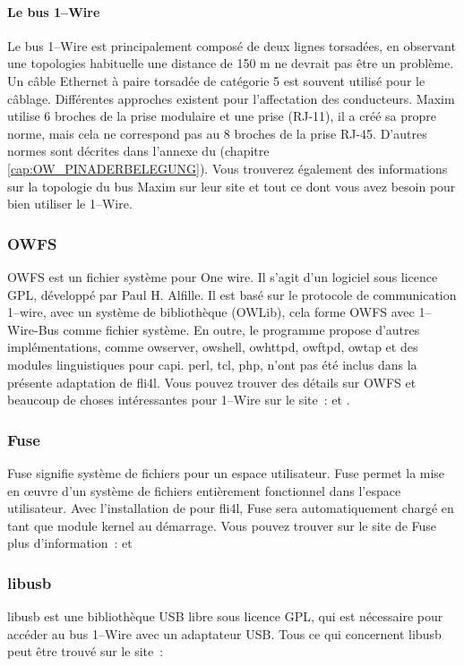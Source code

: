 \paragraph{Le bus 1--Wire}
Le bus 1--Wire est principalement composé de deux lignes torsadées, en observant une topologies
habituelle une distance de 150 m ne devrait pas être un problème. Un câble Ethernet à paire
torsadée de catégorie 5 est souvent utilisé pour le câblage. Différentes approches existent pour
l'affectation des conducteurs. Maxim utilise 6 broches de la prise modulaire et une prise (RJ-11),
il a créé sa propre norme, mais cela ne correspond pas au 8 broches de la prise RJ-45. D'autres
normes sont décrites dans l'annexe du (chapitre \ref{cap:OW_PINADERBELEGUNG}). Vous trouverez
également des informations sur la topologie du bus Maxim sur leur site et tout ce dont vous
avez besoin pour bien utiliser le 1--Wire.

{
\subsubsection{OWFS}
}
OWFS est un \flqq{}fichier système pour One wire\frqq{}. Il s'agit d'un logiciel sous
licence GPL, développé par Paul H. Alfille. Il est basé sur le protocole de communication
1--wire, avec un système de bibliothèque (OWLib), cela forme OWFS avec 1--Wire-Bus comme fichier
système. En outre, le programme propose d'autres implémentations, comme owserver, owshell,
owhttpd, owftpd, owtap et des modules linguistiques pour capi. perl, tcl, php, n'ont pas été
inclus dans la présente adaptation de fli4l. Vous pouvez trouver des détails sur OWFS et
beaucoup de choses intéressantes pour 1--Wire sur le site~:  et
.

\subsubsection{Fuse}
Fuse signifie \flqq{}système de fichiers pour un espace utilisateur\frqq{}. Fuse permet la mise
en \oe{}uvre d'un système de fichiers entièrement fonctionnel dans l'espace utilisateur.
Avec l'installation de  pour fli4l, Fuse sera automatiquement chargé en tant
que module kernel au démarrage. Vous pouvez trouver sur le site de Fuse plus d'information~:
 et 

\subsubsection{libusb}
libusb est une bibliothèque USB libre sous licence GPL, qui est nécessaire pour accéder au bus
1--Wire avec un adaptateur USB. Tous ce qui concernent libusb peut être trouvé sur le site~:

